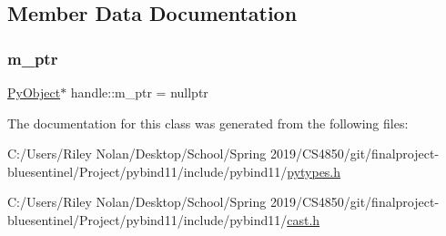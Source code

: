 \subsection{Member Data Documentation}
\mbox{\label{classhandle_a1e9241eea11b47aa15559ccf6fb229f6}} 
\subsubsection{\texorpdfstring{m\_ptr}{m\_ptr}}
{\footnotesize\ttfamily \mbox{\hyperlink{_python27_2object_8h_aadc84ac7aed2cfa6f20c25f62bf3dac7}{Py\+Object}}$\ast$ handle\+::m\+\_\+ptr = nullptr\hspace{0.3cm}{\ttfamily [protected]}}



The documentation for this class was generated from the following files\+:\begin{DoxyCompactItemize}
\item 
C\+:/\+Users/\+Riley Nolan/\+Desktop/\+School/\+Spring 2019/\+C\+S4850/git/finalproject-\/bluesentinel/\+Project/pybind11/include/pybind11/\mbox{\hyperlink{pytypes_8h}{pytypes.\+h}}\item 
C\+:/\+Users/\+Riley Nolan/\+Desktop/\+School/\+Spring 2019/\+C\+S4850/git/finalproject-\/bluesentinel/\+Project/pybind11/include/pybind11/\mbox{\hyperlink{cast_8h}{cast.\+h}}\end{DoxyCompactItemize}

